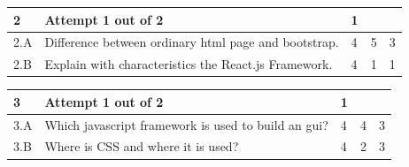 \documentclass[12pt]{article}
\begin{document}
	
	


	
	
		

	
	
	\begin{tabular}{|L{1cm}|L{8cm}|C{2cm}|C{2cm}|C{1cm}|}
			\bf2 & Attempt 1 out of 2 & 1 & & \\ \hline
				2.A &
	Difference between ordinary html page and bootstrap. \newline
		 &  4 & 5 & 3\\ \hline
		2.B &
	Explain with characteristics the React.js Framework. \newline
		 &  4 & 1 & 1\\ \hline
		\end{tabular}

	
	


	
	
		

	
	
	\begin{tabular}{|L{1cm}|L{8cm}|C{2cm}|C{2cm}|C{1cm}|}
			\bf3 & Attempt 1 out of 2 & 1 & & \\ \hline
				3.A &
	Which javascript framework is used to build an gui? \newline
		 &  4 & 4 & 3\\ \hline
		3.B &
	Where is CSS and where it is used? \newline
		 &  4 & 2 & 3\\ \hline
		\end{tabular}

	
	


	
	
		
	
\end{document}
